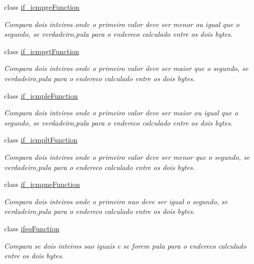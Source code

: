 \begin{DoxyCompactItemize}
class \hyperlink{classInstruction_1_1if__icmpgeFunction}{if\+\_\+icmpge\+Function}
\begin{DoxyCompactList}\small\item\em Compara dois inteiros onde o primeiro valor deve ser menor ou igual que o segundo, se verdadeiro,pula para o endereco calculado entre os dois bytes. \end{DoxyCompactList}\item 
class \hyperlink{classInstruction_1_1if__icmpgtFunction}{if\+\_\+icmpgt\+Function}
\begin{DoxyCompactList}\small\item\em Compara dois inteiros onde o primeiro valor deve ser maior que o segundo, se verdadeiro,pula para o endereco calculado entre os dois bytes. \end{DoxyCompactList}\item 
class \hyperlink{classInstruction_1_1if__icmpleFunction}{if\+\_\+icmple\+Function}
\begin{DoxyCompactList}\small\item\em Compara dois inteiros onde o primeiro valor deve ser maior ou igual que o segundo, se verdadeiro,pula para o endereco calculado entre os dois bytes. \end{DoxyCompactList}\item 
class \hyperlink{classInstruction_1_1if__icmpltFunction}{if\+\_\+icmplt\+Function}
\begin{DoxyCompactList}\small\item\em Compara dois inteiros onde o primeiro valor deve ser menor que o segundo, se verdadeiro,pula para o endereco calculado entre os dois bytes. \end{DoxyCompactList}\item 
class \hyperlink{classInstruction_1_1if__icmpneFunction}{if\+\_\+icmpne\+Function}
\begin{DoxyCompactList}\small\item\em Compara dois inteiros onde o primeiro nao deve ser igual o segundo, se verdadeiro,pula para o endereco calculado entre os dois bytes. \end{DoxyCompactList}\item 
class \hyperlink{classInstruction_1_1ifeqFunction}{ifeq\+Function}
\begin{DoxyCompactList}\small\item\em Compara se dois inteiros sao iguais e se forem pula para o endereco calculado entre os dois bytes. \end{DoxyCompactList}\item 

\end{DoxyCompactItemize}
